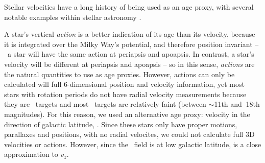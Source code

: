 Stellar velocities have a long history of being used as an age proxy, with
several notable examples within stellar astronomy \citep[\eg][]{faherty2009,
west2011}.

A star's vertical {\it action} is a better indication of its age than its
velocity, because it is integrated over the Milky Way's potential, and
therefore position invariant -- \eg\ a star will have the same action at
periapsis and apoapsis.
In contrast, a star's velocity will be different at periapsis and apoapsis --
so in this sense, {\it actions} are the natural quantities to use as age
proxies.
However, actions can only be calculated will full 6-dimensional position and
velocity information, yet most stars with rotation periods do not have radial
velocity measurements because they are \kepler\ targets and most \kepler\
targets are relatively faint (between $\sim$11th and $~$18th magnitudes).
For this reason, we used an alternative age proxy: velocity in the direction
of galactic latitude, \vb.
Since these stars only have proper motions, parallaxes and positions, with no
radial velocites, we could not calculate full 3D velocities or actions.
However, since the \kepler\ field is at low galactic latitude, \vb is a close
approximation to $v_z$.

